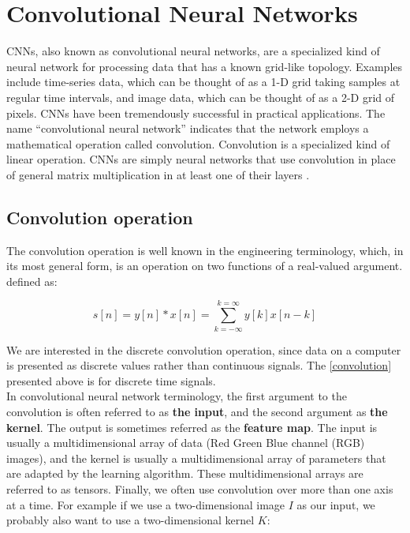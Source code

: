 \chapter[Convolution neural networks]{Convolutional Neural Networks}

CNNs, also known as convolutional neural networks, are a specialized kind of neural network for processing data that has a known grid-like topology. Examples include time-series data, which can be thought of as a 1-D grid taking samples at regular time intervals, and image data, which can be thought of as a 2-D grid of pixels. CNNs have been tremendously successful in practical applications. The name “convolutional neural network” indicates that the network employs a mathematical operation called convolution. Convolution is a specialized kind of linear operation. CNNs are simply neural networks that use convolution in place of general matrix multiplication in at least one of their layers \cite{Ian16}.

\section{Convolution operation}

The convolution operation is well known in the engineering terminology, which, in its most general form, is an operation on two functions of a real-valued argument.
defined as:

\begin{equation}
  \label{convolution}
  s[n] = y[n] \ast x[n] = \sum_{k=-\infty}^{k=\infty} y[k] x[n - k]
\end{equation}

We are interested in the discrete convolution operation, since data on a computer is presented as discrete values rather than continuous signals. The \cref{convolution} presented above is for discrete time signals. \\

In convolutional neural network terminology, the first argument to the convolution is often referred to as \textbf{the input}, and the second argument as \textbf{the kernel}. The output is sometimes referred as the \textbf{feature map}. The input is usually a multidimensional array of data (Red Green Blue channel (RGB) images), and the kernel is usually a multidimensional array of parameters that are adapted by the learning algorithm. These multidimensional arrays are referred to as tensors. Finally, we often use convolution over more than one axis at a time. For example if we use a two-dimensional image $I$ as our input, we probably also want to use a two-dimensional kernel $K$:

